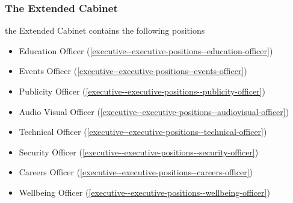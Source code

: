 \documentclass[parskip=half]{scrartcl}
\begin{document}
            \subsubsection{The Extended Cabinet}
                \label{executive--cabinet--extended}
                the Extended Cabinet contains the following positions
                \begin{itemize}
                    \item Education Officer (\ref{executive--executive-positions--education-officer})
                    \item Events Officer (\ref{executive--executive-positions--events-officer})
                    \item Publicity Officer (\ref{executive--executive-positions--publicity-officer})
                    \item Audio Visual Officer (\ref{executive--executive-positions--audiovisual-officer})
                    \item Technical Officer (\ref{executive--executive-positions--technical-officer})
                    \item Security Officer (\ref{executive--executive-positions--security-officer})
                    \item Careers Officer (\ref{executive--executive-positions--careers-officer})
                    \item Wellbeing Officer (\ref{executive--executive-positions--wellbeing-officer})
                \end{itemize}
                
\end{document}
